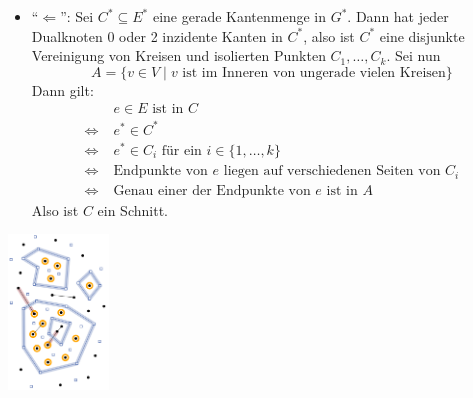 \begin{enumerate}
\begin{itemize}
		\item \enquote{$\Leftarrow$}: Sei $C^*\subseteq E^*$ eine gerade Kantenmenge in $G^*$. Dann hat jeder Dualknoten 0 oder 2 inzidente Kanten in $C^*$, also ist $C^*$ eine disjunkte Vereinigung von Kreisen und isolierten Punkten $C_1,\ldots,C_k$. Sei nun 
		$$A=\{v\in V\mid v \text{ ist im Inneren von ungerade vielen Kreisen}\}$$
		Dann gilt:
		$$
		\begin{aligned}
			& e\in E \text{ ist in } C \\
			\Leftrightarrow\; & e^*\in C^*\\
			\Leftrightarrow\; & e^*\in C_i \text{ für ein } i\in\{1,\ldots,k\}\\
			\Leftrightarrow\; & \text{Endpunkte von } e \text{ liegen auf verschiedenen Seiten von } C_i\\
			\Leftrightarrow\; & \text{Genau einer der Endpunkte von } e \text{ ist in } A
 		\end{aligned}
		$$
		Also ist $C$ ein Schnitt.
	\end{itemize}
	\begin{center}
		\includegraphics[width=0.2\textwidth]{images/mmc-4.png}
	\end{center}
\end{enumerate}

